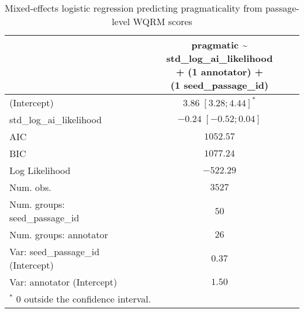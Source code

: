
\usepackage{booktabs}

\begin{table}[htbp]
\begin{center}
\begin{tabular}{l c}
\toprule
 & \shortstack[l]{pragmatic \textasciitilde{} std\_log\_ai\_likelihood  \\ 
+ (1 \textbar{} annotator) + \\ 
(1 \textbar{} seed\_passage\_id)} \\
\midrule
(Intercept)                        & $3.86 \; [ 3.28; 4.44]^{*}$ \\
std\_log\_ai\_likelihood           & $-0.24 \; [-0.52; 0.04]$    \\
\midrule
AIC                                & $1052.57$                   \\
BIC                                & $1077.24$                   \\
Log Likelihood                     & $-522.29$                   \\
Num. obs.                          & $3527$                      \\
Num. groups: seed\_passage\_id     & $50$                        \\
Num. groups: annotator             & $26$                        \\
Var: seed\_passage\_id (Intercept) & $0.37$                      \\
Var: annotator (Intercept)         & $1.50$                      \\
\bottomrule
\multicolumn{2}{l}{\scriptsize{$^*$ 0 outside the confidence interval.}}
\end{tabular}
\caption{Mixed-effects logistic regression predicting pragmaticality from passage-level WQRM scores}
\label{tab:glmer_prag_ail}
\end{center}
\end{table}
